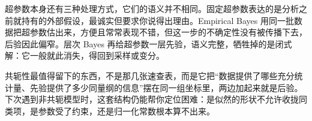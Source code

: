 超参数本身还有三种处理方式，它们的语义并不相同。固定超参数表达的是分析之前就持有的外部假设，最诚实但要求你说得出理由。Empirical Bayes 用同一批数据把超参数估出来，方便且常常表现不错，但这一步的不确定性没有被传播下去，后验因此偏窄。层次 Bayes 再给超参数一层先验，语义完整，牺牲掉的是闭式解：它一般就此消失，得回到采样或变分。

共轭性最值得留下的东西，不是那几张速查表，而是它把``数据提供了哪些充分统计量、先验提供了多少同量纲的信息''摆在同一组坐标里，两边加起来就是后验。下次遇到非共轭模型时，这套结构仍能帮你定位困难：是似然的形状不允许收拢同类项，是参数受了约束，还是归一化常数根本算不出来。
